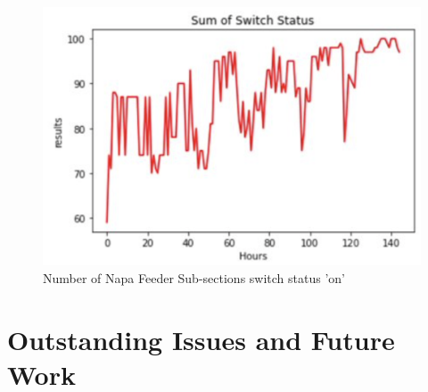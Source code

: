 \documentclass{article}
\begin{document}
\begin{figure}[H]
    \centering
    \begin{minipage}{0.4\textwidth}
        \centering
        \includegraphics[width=1\textwidth]{SwitchTimeline.png}
        \caption{Number of Napa Feeder Sub-sections switch status 'on'}
    \end{minipage}
\end{figure}


\section{Outstanding Issues and Future Work}
\end{document}
